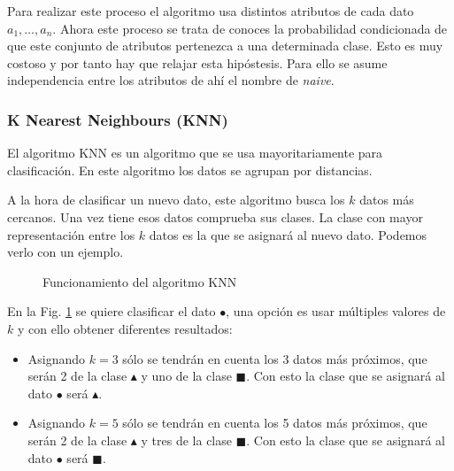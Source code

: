 Para realizar este proceso el algoritmo usa distintos atributos de cada dato $a_1, \dots, a_n$. Ahora este proceso se trata de conoces la probabilidad condicionada de que este conjunto de atributos pertenezca a una determinada clase. Esto es muy costoso y por tanto hay que relajar esta hipóstesis. Para ello se asume independencia entre los atributos de ahí el nombre de \textit{naive}.

\subsubsection{K Nearest Neighbours (KNN)}

El algoritmo KNN es un algoritmo que se usa mayoritariamente para clasificación. En este algoritmo los datos se agrupan por distancias.

A la hora de clasificar un nuevo dato, este algoritmo busca los $k$ datos más cercanos. Una vez tiene esos datos comprueba sus clases. La clase con mayor representación entre los $k$ datos es la que se asignará al nuevo dato. Podemos verlo con un ejemplo.

\begin{figure}[htpb!]
    \centering
    \caption{Funcionamiento del algoritmo KNN \cite{knnalgorithm2010}}
    \label{fig:knn_clasification}
\end{figure}

En la Fig. \ref{fig:knn_clasification} se quiere clasificar el dato \textcolor{verdedato}{\Large$\bullet$}, una opción es usar múltiples valores de $k$ y con ello obtener diferentes resultados:
\begin{itemize}
    \item Asignando $k = 3$ sólo se tendrán en cuenta los 3 datos más próximos, que serán 2 de la clase \textcolor{rojodato}{\large$\blacktriangle$} y uno de la clase \textcolor{azuldato}{$\blacksquare$}. Con esto la clase que se asignará al dato \textcolor{verdedato}{\Large$\bullet$} será \textcolor{rojodato}{\large$\blacktriangle$}.
    \item Asignando $k = 5$ sólo se tendrán en cuenta los 5 datos más próximos, que serán 2 de la clase \textcolor{rojodato}{\large$\blacktriangle$} y tres de la clase \textcolor{azuldato}{$\blacksquare$}. Con esto la clase que se asignará al dato \textcolor{verdedato}{\Large$\bullet$} será \textcolor{azuldato}{$\blacksquare$}.
\end{itemize}

